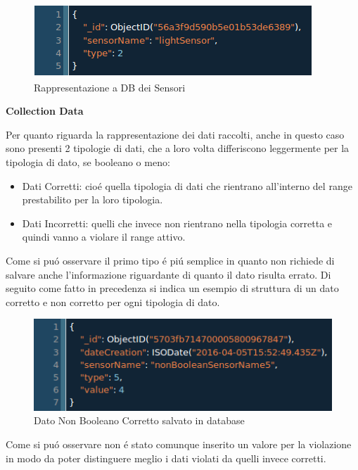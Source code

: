 \begin{figure}[ht]
\centering
\includegraphics[scale=0.5,natwidth=610,natheight=642]{Figures/DataStructures/Sensors.png}
\caption{Rappresentazione a DB dei Sensori}
\end{figure}

\newpage

\begin{center}
\textbf{Collection Data}
\end{center}

Per quanto riguarda la rappresentazione dei dati raccolti, anche in questo caso sono presenti 2 tipologie di dati, che a loro volta differiscono leggermente per la tipologia di dato, se booleano o meno:
\begin{itemize}
\item Dati Corretti: cio\'e quella tipologia di dati che rientrano all'interno del range prestabilito per la loro tipologia.
\item Dati Incorretti: quelli che invece non rientrano nella tipologia corretta e quindi vanno a violare il range attivo.
\end{itemize}

Come si pu\'o osservare il primo tipo \'e pi\'u semplice in quanto non richiede di salvare anche l'informazione riguardante di quanto il dato risulta errato. Di seguito come fatto in precedenza si indica un esempio di struttura di un dato corretto e non corretto per ogni tipologia di dato.

\begin{figure}[ht]
\centering
\includegraphics[scale=0.5,natwidth=610,natheight=642]{Figures/DataStructures/DataNoViolation.png}
\caption{Dato Non Booleano Corretto salvato in database}
\end{figure}

Come si pu\'o osservare non \'e stato comunque inserito un valore per la violazione in modo da poter distinguere meglio i dati violati da quelli invece corretti.

